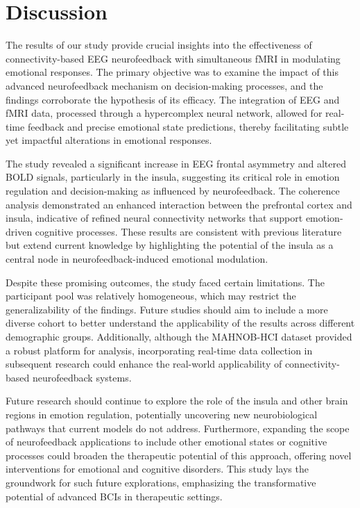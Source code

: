 \documentclass{article}
\begin{document}
\section{Discussion}
The results of our study provide crucial insights into the effectiveness of connectivity-based EEG neurofeedback with simultaneous fMRI in modulating emotional responses. The primary objective was to examine the impact of this advanced neurofeedback mechanism on decision-making processes, and the findings corroborate the hypothesis of its efficacy. The integration of EEG and fMRI data, processed through a hypercomplex neural network, allowed for real-time feedback and precise emotional state predictions, thereby facilitating subtle yet impactful alterations in emotional responses.

The study revealed a significant increase in EEG frontal asymmetry and altered BOLD signals, particularly in the insula, suggesting its critical role in emotion regulation and decision-making as influenced by neurofeedback. The coherence analysis demonstrated an enhanced interaction between the prefrontal cortex and insula, indicative of refined neural connectivity networks that support emotion-driven cognitive processes. These results are consistent with previous literature but extend current knowledge by highlighting the potential of the insula as a central node in neurofeedback-induced emotional modulation.

Despite these promising outcomes, the study faced certain limitations. The participant pool was relatively homogeneous, which may restrict the generalizability of the findings. Future studies should aim to include a more diverse cohort to better understand the applicability of the results across different demographic groups. Additionally, although the MAHNOB-HCI dataset provided a robust platform for analysis, incorporating real-time data collection in subsequent research could enhance the real-world applicability of connectivity-based neurofeedback systems.

Future research should continue to explore the role of the insula and other brain regions in emotion regulation, potentially uncovering new neurobiological pathways that current models do not address. Furthermore, expanding the scope of neurofeedback applications to include other emotional states or cognitive processes could broaden the therapeutic potential of this approach, offering novel interventions for emotional and cognitive disorders. This study lays the groundwork for such future explorations, emphasizing the transformative potential of advanced BCIs in therapeutic settings.
\end{document}
